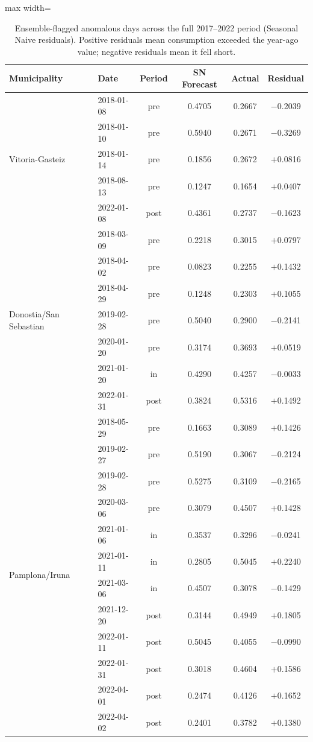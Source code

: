 ﻿\documentclass[12pt,reqno, twoside]{amsbook}
\numberwithin{figure}{chapter}
\numberwithin{table}{chapter}
\numberwithin{equation}{chapter}
\theoremstyle{plain}
\numberwithin{equation}{chapter}
\numberwithin{section}{chapter}
\begin{document}
\begin{table}[htbp]
\centering
\caption{Ensemble-flagged anomalous days across the full 2017--2022 period (Seasonal Naive residuals). Positive residuals mean consumption exceeded the year-ago value; negative residuals mean it fell short.}
\label{tab:full_period_days}
\begin{adjustbox}{max width=\textwidth}
\begin{tabular}{llcccc}
\toprule
\textbf{Municipality} & \textbf{Date} & \textbf{Period} & \textbf{SN Forecast} & \textbf{Actual} & \textbf{Residual} \\
\midrule
\multirow{5}{*}{Vitoria-Gasteiz}
  & 2018-01-08 & pre  & 0.4705 & 0.2667 & $-$0.2039 \\
  & 2018-01-10 & pre  & 0.5940 & 0.2671 & $-$0.3269 \\
  & 2018-01-14 & pre  & 0.1856 & 0.2672 & $+$0.0816 \\
  & 2018-08-13 & pre  & 0.1247 & 0.1654 & $+$0.0407 \\
  & 2022-01-08 & post & 0.4361 & 0.2737 & $-$0.1623 \\
\midrule
\multirow{7}{*}{Donostia/San Sebastian}
  & 2018-03-09 & pre  & 0.2218 & 0.3015 & $+$0.0797 \\
  & 2018-04-02 & pre  & 0.0823 & 0.2255 & $+$0.1432 \\
  & 2018-04-29 & pre  & 0.1248 & 0.2303 & $+$0.1055 \\
  & 2019-02-28 & pre  & 0.5040 & 0.2900 & $-$0.2141 \\
  & 2020-01-20 & pre  & 0.3174 & 0.3693 & $+$0.0519 \\
  & 2021-01-20 & in   & 0.4290 & 0.4257 & $-$0.0033 \\
  & 2022-01-31 & post & 0.3824 & 0.5316 & $+$0.1492 \\
\midrule
\multirow{12}{*}{Pamplona/Iruna}
  & 2018-05-29 & pre  & 0.1663 & 0.3089 & $+$0.1426 \\
  & 2019-02-27 & pre  & 0.5190 & 0.3067 & $-$0.2124 \\
  & 2019-02-28 & pre  & 0.5275 & 0.3109 & $-$0.2165 \\
  & 2020-03-06 & pre  & 0.3079 & 0.4507 & $+$0.1428 \\
  & 2021-01-06 & in   & 0.3537 & 0.3296 & $-$0.0241 \\
  & 2021-01-11 & in   & 0.2805 & 0.5045 & $+$0.2240 \\
  & 2021-03-06 & in   & 0.4507 & 0.3078 & $-$0.1429 \\
  & 2021-12-20 & post & 0.3144 & 0.4949 & $+$0.1805 \\
  & 2022-01-11 & post & 0.5045 & 0.4055 & $-$0.0990 \\
  & 2022-01-31 & post & 0.3018 & 0.4604 & $+$0.1586 \\
  & 2022-04-01 & post & 0.2474 & 0.4126 & $+$0.1652 \\
  & 2022-04-02 & post & 0.2401 & 0.3782 & $+$0.1380 \\
\bottomrule
\end{tabular}
\end{adjustbox}
\end{table}
\end{document}
